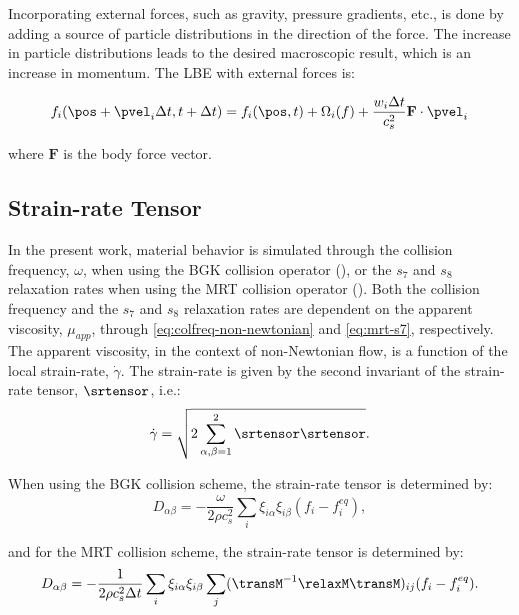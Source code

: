 Incorporating external forces, such as gravity, pressure gradients, etc., is done by adding a source of particle distributions in the direction of the force.
The increase in particle distributions leads to the desired macroscopic result, which is an increase in momentum.
The LBE with external forces is:

\begin{equation}
f_i(\pos + \pvel_i \Delta t, t + \Delta t) = f_i(\pos, t) + \Omega_i(f) + \frac{w_i \Delta t}{c_s^2} \mathbf{F} \cdot \pvel_i
\end{equation}

\noindent where $\mathbf{F}$ is the body force vector.

\subsection{Strain-rate Tensor}

In the present work, material behavior is simulated through the collision frequency, $\omega$, when using the BGK collision operator (), or the $s_7$ and $s_8$ relaxation rates when using the MRT collision operator ().
Both the collision frequency and the $s_7$ and $s_8$ relaxation rates are dependent on the apparent viscosity, $\mu_{app}$, through \eqref{eq:colfreq-non-newtonian} and \eqref{eq:mrt-s7}, respectively.
The apparent viscosity, in the context of non-Newtonian flow, is a function of the local strain-rate, $\dot{\gamma}$.
The strain-rate is given by the second invariant of the strain-rate tensor, $\srtensor$, i.e.:
\begin{equation} \label{eq:second-invariant}
\dot{\gamma} = \sqrt{2 \sum_{\alpha,\beta=1}^{2} \srtensor \srtensor}.
\end{equation}

\noindent When using the BGK collision scheme, the strain-rate tensor is determined by:
\begin{equation} \label{eq:srtensor-bgk}
D_{\alpha \beta} = -\frac{\omega}{2 \rho c_s^2} \sum_i \xi_{i \alpha} \xi_{i \beta} (f_i - f^{eq}_i),
\end{equation}

\noindent and for the MRT collision scheme, the strain-rate tensor is determined by:
\begin{equation} \label{eq:srtensor-mrt}
D_{\alpha \beta} = -\frac{1}{2 \rho c_s^2 \Delta t} \sum_i \xi_{i \alpha} \xi_{i \beta} \sum_j (\transM^{-1} \relaxM \transM)_{ij}(f_i - f^{eq}_i).
\end{equation}

